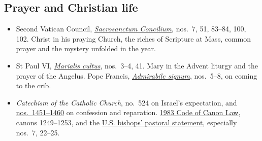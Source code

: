\subsection{Prayer and Christian life}

\begin{itemize}
\item Second Vatican Council, \href{https://www.vatican.va/archive/hist_councils/ii_vatican_council/documents/vat-ii_const_19631204_sacrosanctum-concilium_en.html}{\emph{Sacrosanctum Concilium}}, nos.~7, 51, 83--84, 100, 102. Christ in his praying Church, the riches of Scripture at Mass, common prayer and the mystery unfolded in the year.
\item St Paul VI, \href{https://www.vatican.va/content/paul-vi/en/apost_exhortations/documents/hf_p-vi_exh_19740202_marialis-cultus.html}{\emph{Marialis cultus}}, nos.~3--4, 41. Mary in the Advent liturgy and the prayer of the Angelus. Pope Francis, \href{https://www.vatican.va/content/francesco/en/apost_letters/documents/papa-francesco-lettera-ap_20191201_admirabile-signum.html}{\emph{Admirabile signum}}, nos.~5--8, on coming to the crib.
\item \emph{Catechism of the Catholic Church}, no.~524 on Israel's expectation, and \href{https://www.vatican.va/content/catechism/en/part_two/section_two/chapter_two/article_4/vii_the_acts_of_the_penitent.html}{nos.~1451--1460} on confession and reparation. \href{https://www.vatican.va/archive/cod-iuris-canonici/eng/documents/cic_lib4-cann1244-1253_en.html}{1983 Code of Canon Law}, canons 1249--1253, and the \href{https://www.usccb.org/prayer-and-worship/liturgical-year-and-calendar/lent/us-bishops-pastoral-statement-on-penance-and-abstinence}{U.S. bishops' pastoral statement}, especially nos.~7, 22--25.
\end{itemize}
